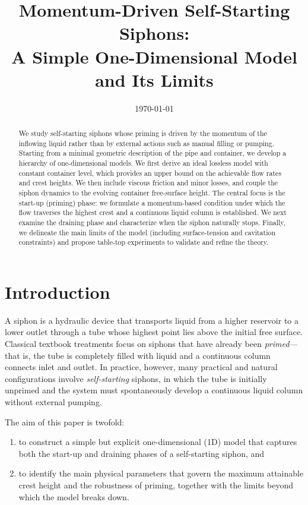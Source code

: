 \documentclass[11pt]{article}
\title{Momentum-Driven Self-Starting Siphons:\\
A Simple One-Dimensional Model and Its Limits}
\author{}
\date{\today}
\begin{document}
\maketitle

\begin{abstract}
We study self-starting siphons whose priming is driven by the momentum of the inflowing liquid rather than by external actions such as manual filling or pumping.
Starting from a minimal geometric description of the pipe and container, we develop a hierarchy of one-dimensional models.
We first derive an ideal lossless model with constant container level, which provides an upper bound on the achievable flow rates and crest heights.
We then include viscous friction and minor losses, and couple the siphon dynamics to the evolving container free-surface height.
The central focus is the start-up (priming) phase: we formulate a momentum-based condition under which the flow traverses the highest crest and a continuous liquid column is established.
We next examine the draining phase and characterize when the siphon naturally stops.
Finally, we delineate the main limits of the model (including surface-tension and cavitation constraints) and propose table-top experiments to validate and refine the theory.
\end{abstract}

\section{Introduction}

A siphon is a hydraulic device that transports liquid from a higher reservoir to a lower outlet through a tube whose highest point lies above the initial free surface.
Classical textbook treatments focus on siphons that have already been \emph{primed}---that is, the tube is completely filled with liquid and a continuous column connects inlet and outlet.
In practice, however, many practical and natural configurations involve \emph{self-starting} siphons, in which the tube is initially unprimed and the system must spontaneously develop a continuous liquid column without external pumping.

The aim of this paper is twofold:
\begin{enumerate}
  \item to construct a simple but explicit one-dimensional (1D) model that captures both the start-up and draining phases of a self-starting siphon, and
  \item to identify the main physical parameters that govern the maximum attainable crest height and the robustness of priming, together with the limits beyond which the model breaks down.
\end{enumerate}
\end{document}
